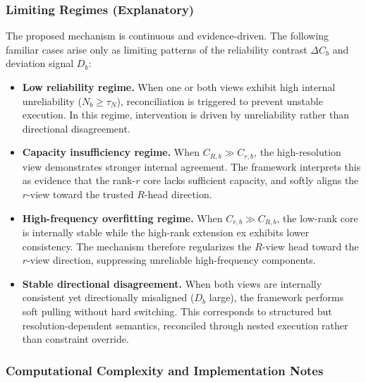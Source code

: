 \documentclass{article}
\begin{document}
\subsubsection{Limiting Regimes (Explanatory)}

The proposed mechanism is continuous and evidence-driven.
The following familiar cases arise only as limiting patterns
of the reliability contrast $\Delta C_b$ and deviation signal $D_b$:

\begin{itemize}

    \item \textbf{Low reliability regime.}
    When one or both views exhibit high internal unreliability
    ($N_b \ge \tau_N$),
    reconciliation is triggered to prevent unstable execution.
    In this regime, intervention is driven by unreliability
    rather than directional disagreement.

    \item \textbf{Capacity insufficiency regime.}
    When $C_{R,b} \gg C_{r,b}$,
    the high-resolution view demonstrates stronger internal agreement.
    The framework interprets this as evidence that the rank-$r$
    core lacks sufficient capacity,
    and softly aligns the $r$-view toward the trusted $R$-head direction.

    \item \textbf{High-frequency overfitting regime.}
    When $C_{r,b} \gg C_{R,b}$,
    the low-rank core is internally stable while the high-rank extension
    ex exhibits lower consistency.
    The mechanism therefore regularizes the $R$-view head toward
    the $r$-view direction, suppressing unreliable high-frequency components.

    \item \textbf{Stable directional disagreement.}
    When both views are internally consistent
    yet directionally misaligned ($D_b$ large),
    the framework performs soft pulling without hard switching.
    This corresponds to structured but resolution-dependent semantics,
    reconciled through nested execution rather than constraint override.

\end{itemize}



\subsubsection{Computational Complexity and Implementation Notes}
\label{sec:complexity}
\end{document}
